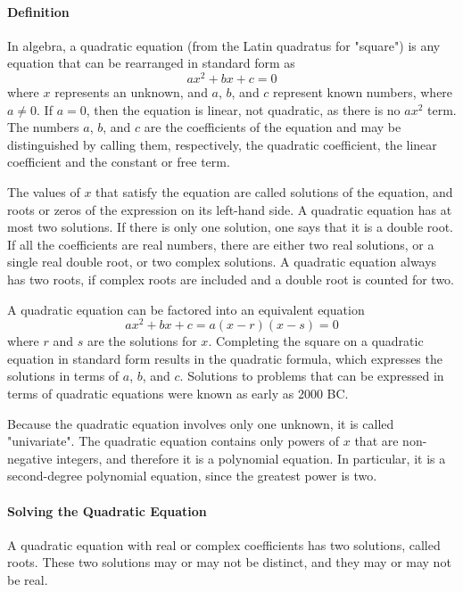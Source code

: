 \paragraph{Definition}

In algebra, a quadratic equation (from the Latin quadratus for "square") is any equation that can be rearranged in standard form as
$$
ax^2 + bx + c = 0
$$
where $x$ represents an unknown, and $a$, $b$, and $c$ represent known numbers, where $a \neq 0$. If $a = 0$, then the equation is linear, not quadratic, as there is no $ax^2$ term. The numbers $a$, $b$, and $c$ are the coefficients of the equation and may be distinguished by calling them, respectively, the quadratic coefficient, the linear coefficient and the constant or free term.

The values of $x$ that satisfy the equation are called solutions of the equation, and roots or zeros of the expression on its left-hand side. A quadratic equation has at most two solutions. If there is only one solution, one says that it is a double root. If all the coefficients are real numbers, there are either two real solutions, or a single real double root, or two complex solutions. A quadratic equation always has two roots, if complex roots are included and a double root is counted for two.

A quadratic equation can be factored into an equivalent equation
$$
ax^2 + bx + c = a(x - r)(x - s) = 0
$$
where $r$ and $s$ are the solutions for $x$. Completing the square on a quadratic equation in standard form results in the quadratic formula, which expresses the solutions in terms of $a$, $b$, and $c$. Solutions to problems that can be expressed in terms of quadratic equations were known as early as 2000 BC.

Because the quadratic equation involves only one unknown, it is called "univariate". The quadratic equation contains only powers of $x$ that are non-negative integers, and therefore it is a polynomial equation. In particular, it is a second-degree polynomial equation, since the greatest power is two.

\paragraph{Solving the Quadratic Equation}

A quadratic equation with real or complex coefficients has two solutions, called roots. These two solutions may or may not be distinct, and they may or may not be real.


